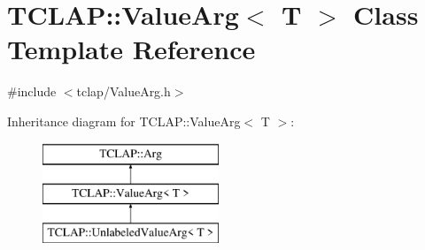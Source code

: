 \hypertarget{class_t_c_l_a_p_1_1_value_arg}{}\section{T\+C\+L\+A\+P\+:\+:Value\+Arg$<$ T $>$ Class Template Reference}
\label{class_t_c_l_a_p_1_1_value_arg}


{\ttfamily \#include $<$tclap/\+Value\+Arg.\+h$>$}

Inheritance diagram for T\+C\+L\+A\+P\+:\+:Value\+Arg$<$ T $>$\+:\begin{figure}[H]
\begin{center}
\leavevmode
\includegraphics[height=3.000000cm]{class_t_c_l_a_p_1_1_value_arg}
\end{center}
\end{figure}
